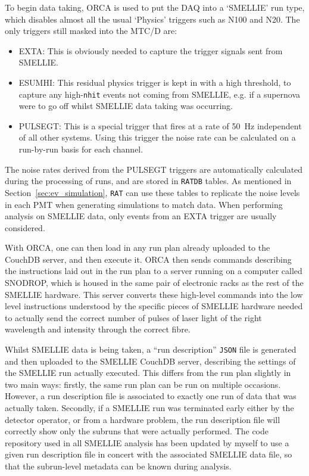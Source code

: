 To begin data taking, ORCA is used to put the DAQ into a `SMELLIE' run type, which disables almost all the usual `Physics' triggers such as N100 and N20. The only triggers still masked into the MTC/D are:
\begin{itemize}
    \item EXTA: This is obviously needed to capture the trigger signals sent from SMELLIE.
    \item ESUMHI: This residual physics trigger is kept in with a high threshold, to capture any high-\texttt{nhit} events not coming from SMELLIE, e.g. if a supernova were to go off whilst SMELLIE data taking was occurring.
    \item PULSEGT: This is a special trigger that fires at a rate of \SI{50}{\Hz} independent of all other systems. Using this trigger the noise rate can be calculated on a run-by-run basis for each channel.
\end{itemize}
The noise rates derived from the PULSEGT triggers are automatically calculated during the processing of runs, and are stored in \texttt{RATDB} tables. As mentioned in Section~\ref{sec:ev_simulation}, \texttt{RAT} can use these tables to replicate the noise levels in each PMT when generating simulations to match data. When performing analysis on SMELLIE data, only events from an EXTA trigger are usually considered.

With ORCA, one can then load in any run plan already uploaded to the CouchDB server, and then execute it. ORCA then sends commands describing the instructions laid out in the run plan to a server running on a computer called SNODROP, which is housed in the same pair of electronic racks as the rest of the SMELLIE hardware. This server converts these high-level commands into the low level instructions understood by the specific pieces of SMELLIE hardware needed to actually send the correct number of pulses of laser light of the right wavelength and intensity through the correct fibre.

Whilst SMELLIE data is being taken, a ``run description'' \texttt{JSON} file is generated and then uploaded to the SMELLIE CouchDB server, describing the settings of the SMELLIE run actually executed. This differs from the run plan slightly in two main ways: firstly, the same run plan can be run on multiple occasions. However, a run description file is associated to exactly one run of data that was actually taken. Secondly, if a SMELLIE run was terminated early either by the detector operator, or from a hardware problem, the run description file will correctly show only the subruns that were actually performed. The code repository used in all SMELLIE analysis has been updated by myself to use a given run description file in concert with the associated SMELLIE data file, so that the subrun-level metadata can be known during analysis.


